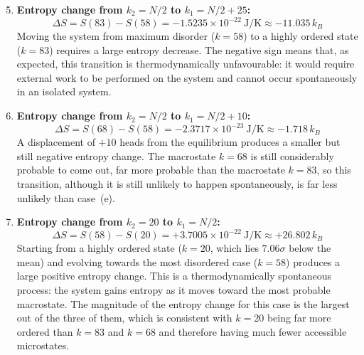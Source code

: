 \documentclass[11pt, a4paper]{article}
\begin{document}
\begin{enumerate}[label=\alph*)]
    \setcounter{enumi}{4}
    
    \item \textbf{Entropy change from $k_2 = N/2$ to $k_1 = N/2 + 25$:}
    \begin{equation} \Delta S = S(83) - S(58) = -1.5235 \times 10^{-22} \ \text{J/K} \approx -11.035 \, k_B \end{equation}
    Moving the system from maximum disorder ($k = 58$) to a highly ordered state ($k = 83$) requires a large entropy decrease. The negative sign means that, as expected, this transition is thermodynamically unfavourable: it would require external work to be performed on the system and cannot occur spontaneously in an isolated system.

    \vspace{0.3cm}
    \item \textbf{Entropy change from $k_2 = N/2$ to $k_1 = N/2 + 10$:}
    \begin{equation} \Delta S = S(68) - S(58) = -2.3717 \times 10^{-23} \ \text{J/K} \approx -1.718 \, k_B \end{equation}
    A displacement of $+10$ heads from the equilibrium produces a smaller but still negative entropy change. The macrostate $k = 68$ is still considerably probable to come out, far more probable than the macrostate $k = 83$, so this transition, although it is still unlikely to happen spontaneously, is far less unlikely than case~(e). 

    \vspace{0.3cm}
    \item \textbf{Entropy change from $k_2 = 20$ to $k_1 = N/2$:}
    \begin{equation} \Delta S = S(58) - S(20) = +3.7005 \times 10^{-22} \ \text{J/K} \approx +26.802 \, k_B \end{equation}
    Starting from a highly ordered state ($k = 20$, which lies $7.06\sigma$ below the mean) and evolving towards the most disordered case ($k = 58$) produces a large positive entropy change. This is a thermodynamically spontaneous process: the system gains entropy as it moves toward the most probable macrostate. The magnitude of the entropy change for this case is the largest out of the three of them, which is consistent with $k = 20$ being far more ordered than $k = 83$ and $k = 68$ and therefore having much fewer accessible microstates.
\end{enumerate}
\end{document}
